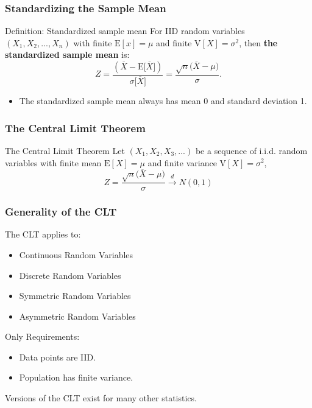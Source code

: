 \documentclass[12pt, block=fill]{beamer}
\newcommand{\E}{\text{E}}
\newcommand{\V}{\text{V}}
\begin{document}
\begin{frame}
  \frametitle{Standardizing the Sample Mean}
  \note{Recall, $$\V\big[\overline{X}\big] = \frac{\V[X]}{n}$$ and
    so
    $$\sigma\big[\overline{X}\big] = \sqrt{\frac{\V[X]}{n}} =
    \frac{\sigma}{\sqrt{n}}.$$}
  \begin{block}{Definition: Standardized sample mean} 
    For IID random variables $(X_1,X_2,...,X_n)$ 
    with finite $\E[x] = \mu$ and finite $\V[X] = \sigma^2$,
    then \textbf{the standardized sample mean} is:
    $$
    Z = \frac{\left(\overline{X} - \E\big[\overline{X}\big]
      \right)}{\sigma\big[\overline{X}\big]} =
    \frac{\sqrt{n}\big(\overline{X} - \mu\big)}{\sigma}.
    $$
  \end{block}
  \begin{itemize}
\item The standardized sample mean always has mean 0 and standard deviation 1.
\end{itemize}

\end{frame}

\begin{frame}
  \frametitle{The Central Limit Theorem}
  \begin{block}{The Central Limit Theorem}
    Let $(X_1,X_2,X_3,...)$ be a sequence of i.i.d. random variables with finite mean $\E[X] = \mu$ and finite variance $\V[X] = \sigma^2$,
    $$
    Z =    \frac{\sqrt{n}\big(\overline{X} - \mu\big)}{\sigma}  \overset{d}{\to} N(0,1)
    $$
  \end{block}
\end{frame}

\begin{frame}
  \frametitle{Generality of the CLT}
The CLT applies to:
    \begin{itemize}
    \item Continuous Random Variables
    \item Discrete Random Variables
    \item Symmetric Random Variables
    \item Asymmetric Random Variables
  \end{itemize}
 Only Requirements:
 \begin{itemize}
\item Data points are IID.
\item Population has finite variance.
\end{itemize}
Versions of the CLT exist for many other statistics.

\end{frame}
\end{document}
